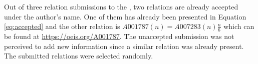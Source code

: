Out of three relation submissions to the \oeis, two relations are already accepted
\cite{oeis-accepted-1,oeis-accepted-2} under the author's name. One of them has already
been presented in Equation \ref{eq:accepted} and the other relation is
$A001787(n) = A007283(n) \frac{n}{6}$ which can be found at
\url{https://oeis.org/A001787}. The unaccepted submission was not perceived to add new
information since a similar relation was already present. The submitted relations were
selected randomly.


